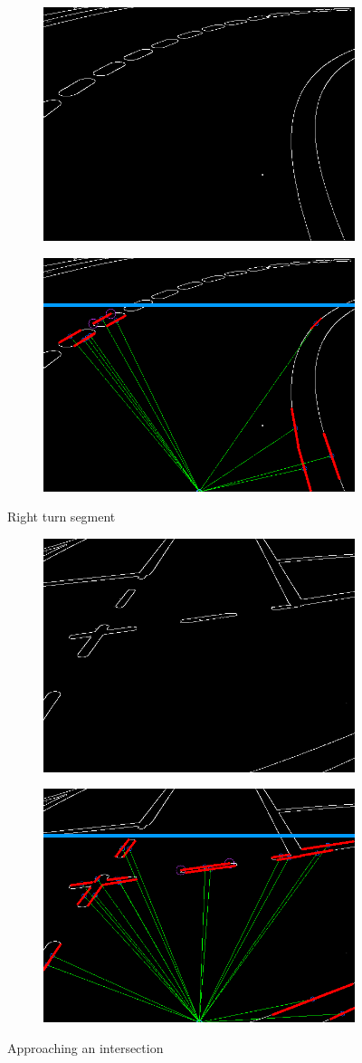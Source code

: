 \documentclass [10pt]{article}
\begin{document}
\begin{figure}
\centering
\begin{subfigure}
  \centering
  \includegraphics[width=.4\linewidth]{figures/right_c.png}
\end{subfigure}%
\begin{subfigure}
  \centering
  \includegraphics[width=.4\linewidth]{figures/right_h.png}
\end{subfigure}
\caption{Right turn segment}
\label{fig:Fig4}
\end{figure}

\begin{figure}
\centering
\begin{subfigure}
  \centering
  \includegraphics[width=.4\linewidth]{figures/intersection2_c.png}
\end{subfigure}%
\begin{subfigure}
  \centering
  \includegraphics[width=.4\linewidth]{figures/intersection2_h.png}
\end{subfigure}
\caption{Approaching an intersection}
\label{fig:Fig5}
\end{figure}
\end{document}
